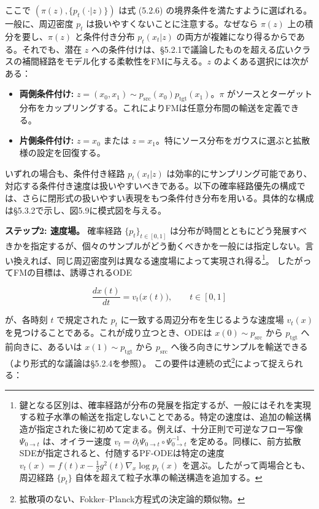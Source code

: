 ここで $(\pi(z),\{p_t(\cdot|z)\})$ は式 (5.2.6) の境界条件を満たすように選ばれる。
一般に、周辺密度 $p_t$ は扱いやすくないことに注意する。なぜなら $\pi(z)$ 上の積分を要し、$\pi(z)$ と条件付き分布 $p_t(x_t|z)$ の両方が複雑になり得るからである。それでも、潜在 $z$ への条件付けは、§5.2.1で議論したものを超える広いクラスの補間経路をモデル化する柔軟性をFMに与える。$z$ のよくある選択には次がある：

\begin{itemize}
\item \textbf{両側条件付け:} $z=(x_0,x_1)\sim p_{\mathrm{src}}(x_0)p_{\mathrm{tgt}}(x_1)$。$\pi$ がソースとターゲット分布をカップリングする。これによりFMは任意分布間の輸送を定義できる。
\item \textbf{片側条件付け:} $z=x_0$ または $z=x_1$。特にソース分布をガウスに選ぶと拡散様の設定を回復する。
\end{itemize}


いずれの場合も、条件付き経路 $p_t(x_t|z)$ は効率的にサンプリング可能であり、対応する条件付き速度は扱いやすいべきである。以下の確率経路優先の構成では、さらに閉形式の扱いやすい表現をもつ条件付き分布を用いる。具体的な構成は§5.3.2で示し、図5.9に模式図を与える。


\textbf{ステップ2: 速度場。} 確率経路 $\{p_t\}_{t\in[0,1]}$ は分布が時間とともにどう発展すべきかを指定するが、個々のサンプルがどう動くべきかを一般には指定しない。言い換えれば、同じ周辺密度列は異なる速度場によって実現され得る\footnote{鍵となる区別は、確率経路が分布の発展を指定するが、一般にはそれを実現する粒子水準の輸送を指定しないことである。特定の速度は、追加の輸送構造が指定された後に初めて定まる。例えば、十分正則で可逆なフロー写像 $\Psi_{0\to t}$ は、オイラー速度 $v_t=\partial_t\Psi_{0\to t}\circ\Psi_{0\to t}^{-1}$ を定める。同様に、前方拡散SDEが指定されると、付随するPF-ODEは特定の速度 $v_t(x)=f(t)x-\frac{1}{2}g^2(t)\nabla_x\log p_t(x)$ を選ぶ。したがって両場合とも、周辺経路 $\{p_t\}$ 自体を超えて粒子水準の輸送構造を追加する。}。
したがってFMの目標は、誘導されるODE

\[
\frac{dx(t)}{dt}=v_t\bigl(x(t)\bigr),\qquad t\in[0,1]
\]


が、各時刻 $t$ で規定された $p_t$ に一致する周辺分布を生じるような速度場 $v_t(x)$ を見つけることである。これが成り立つとき、ODEは $x(0)\sim p_{\mathrm{src}}$ から $p_{\mathrm{tgt}}$ へ前向きに、あるいは $x(1)\sim p_{\mathrm{tgt}}$ から $p_{\mathrm{src}}$ へ後ろ向きにサンプルを輸送できる（より形式的な議論は§5.2.4を参照）。
この要件は連続の式\footnote{拡散項のない、Fokker–Planck方程式の決定論的類似物。}によって捉えられる：

